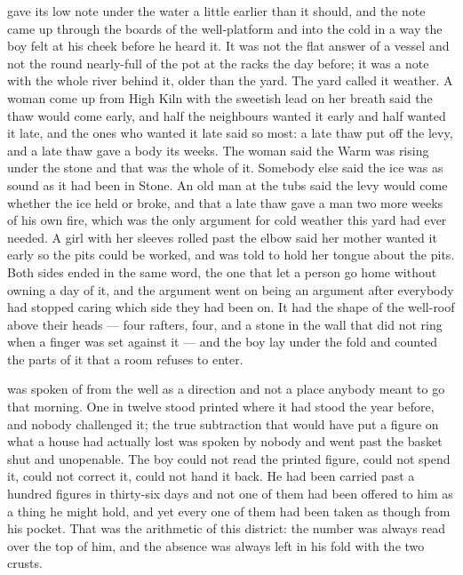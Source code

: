 gave its low note under the water a little earlier than it should, and the note came up through the boards of the well-platform and into the cold in a way the boy felt at his cheek before he heard it. It was not the flat answer of a vessel and not the round nearly-full of the pot at the racks the day before; it was a note with the whole river behind it, older than the yard. The yard called it weather. A woman come up from High Kiln with the sweetish lead on her breath said the thaw would come early, and half the neighbours wanted it early and half wanted it late, and the ones who wanted it late said so most: a late thaw put off the levy, and a late thaw gave a body its weeks. The woman said the Warm was rising under the stone and that was the whole of it. Somebody else said the ice was as sound as it had been in Stone. An old man at the tubs said the levy would come whether the ice held or broke, and that a late thaw gave a man two more weeks of his own fire, which was the only argument for cold weather this yard had ever needed. A girl with her sleeves rolled past the elbow said her mother wanted it early so the pits could be worked, and was told to hold her tongue about the pits. Both sides ended in the same word, the one that let a person go home without owning a day of it, and the argument went on being an argument after everybody had stopped caring which side they had been on. It had the shape of the well-roof above their heads --- four rafters, four, and a stone in the wall that did not ring when a finger was set against it --- and the boy lay under the fold and counted the parts of it that a room refuses to enter.

 was spoken of from the well as a direction and not a place anybody meant to go that morning. One in twelve stood printed where it had stood the year before, and nobody challenged it; the true subtraction that would have put a figure on what a house had actually lost was spoken by nobody and went past the basket shut and unopenable. The boy could not read the printed figure, could not spend it, could not correct it, could not hand it back. He had been carried past a hundred figures in thirty-six days and not one of them had been offered to him as a thing he might hold, and yet every one of them had been taken as though from his pocket. That was the arithmetic of this district: the number was always read over the top of him, and the absence was always left in his fold with the two crusts.

